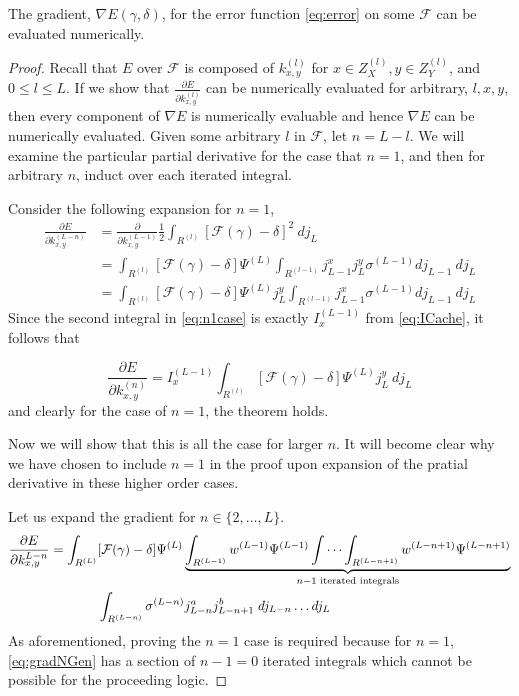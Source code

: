 \begin{theorem}
The gradient, $\nabla E(\gamma,\delta)$, for the error function \eqref{eq:error} on some $\mathcal{F}$ can be evaluated numerically.
\end{theorem}

\begin{proof}
  Recall that $E$ over $\mathcal{F}$ is composed of $k^{(l)}_{x,y}$ for $x \in Z^{(l)}_X, y \in Z^{(l)}_Y$, and $0\leq l \leq L$.
  If we show that $\frac{\partial E}{\partial k^{(l)}_{x,y}}$ can be numerically evaluated for arbitrary, $l,x,y$, then every component of $\nabla E$ is numerically evaluable and hence $\nabla E$ can be numerically evaluated.
  Given some arbitrary $l$ in $\mathcal{F}$, let $n = L - l$.
  We will examine the particular partial derivative for the case that $n = 1$, and then for arbitrary $n$, induct over each iterated integral.

  Consider the following expansion for $n = 1$,
  \begin{align}
  \frac{\partial E}{\partial k^{(L-n)}_{x,y}} &= 
    \frac{\partial}{\partial k^{(L-1)}_{x,y}} 
    \frac{1}{2} \int_{R^{(l)}} \left[\mathcal{F}(\gamma) - \delta\right]^2\ dj_L \nonumber \\
  &= \int_{R^{(l)}} \left[\mathcal{F}(\gamma) - \delta\right] \Psi^{(L)} 
    \int_{R^{(l-1)}} j_{L-1}^x j_{L}^y \sigma^{(L-1)} dj_{L-1}\ dj_L \nonumber \\
  &= \int_{R^{(l)}} \left[\mathcal{F}(\gamma) - \delta\right] \Psi^{(L)} j_{L}^y 
    \int_{R^{(l-1)}} j_{L-1}^x \sigma^{(L-1)} dj_{L-1}\ dj_L \label{eq:n1case}
  \end{align}
  Since the second integral in \eqref{eq:n1case} is exactly $I^{(L-1)}_x$ from    \eqref{eq:ICache}, it follows that 
  
  \begin{equation}
  \frac{\partial E}{\partial k^{(n)}_{x,y}} = I^{(L-1)}_x
    \int_{R^{(l)}} \left[\mathcal{F}(\gamma) - \delta\right] \Psi^{(L)} j_{L}^y  \ dj_L
  \end{equation}
  and clearly for the case of $n=1$, the theorem holds. 

  Now we will show that this is all the case for larger $n$. 
  It will become clear why we have chosen to include $n=1$ in the proof upon expansion of the pratial derivative in these higher order cases.

  Let us expand the gradient for $n\in \{2,\dots,L\}$.
  \begin{equation} \label{eq:gradNGen}
  \begin{aligned} 
  \frac{\partial  E}{\partial k^{L-n}_{x,y}} = 
  \int_{R^{(L)}}  &[\mathcal{F}(\gamma)-\delta] \Psi^{(L)} 
   \underbrace{\int_{R^{(L-1)}} w^{(L-1)} \Psi^{(L-1)} 
  \idotsint_{R^{(L-n+1)}} w^{(L-n+1)} \Psi^{(L-n+1)}}_{n-1\text{ iterated integrals}} \\ 
    &\int_{R^{(L-n)}} \sigma^{(L-n)} j^{a}_{L-n}j^{b}_{L-n+1}\; dj_{L-n}\dots dj_L
  \end{aligned}
  \end{equation}
  As aforementioned, proving the $n=1$ case is required because for $n=1$, \eqref{eq:gradNGen} has a section of $n-1 = 0$ iterated integrals which cannot be possible for the proceeding logic.


\end{proof}
